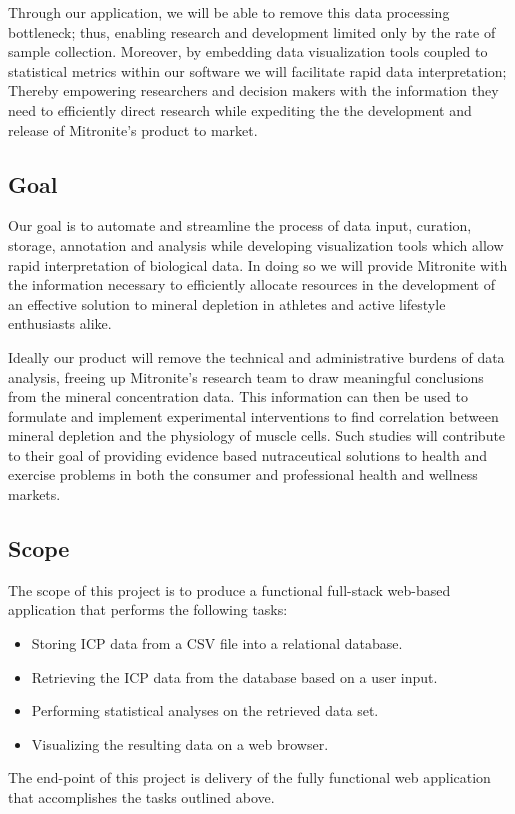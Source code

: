 \documentclass[10pt,twocolumn,letterpaper]{article}
\begin{document}
            Through our application, we will be able to remove this data processing bottleneck; thus, enabling research and development limited only by the rate of sample collection. Moreover, by embedding data visualization tools coupled to statistical metrics within our software we will facilitate rapid data interpretation; Thereby empowering researchers and decision makers with the information they need to efficiently direct research while expediting the the development and release of Mitronite's product to market.

            \subsection{Goal}

            Our goal is to automate and streamline the process of data input, curation, storage, annotation and analysis while developing visualization tools which allow rapid 
	    interpretation of biological data. 
	    In doing so we will provide Mitronite with the information necessary to efficiently allocate resources in the development of an effective solution to mineral depletion in 
	    athletes and active lifestyle enthusiasts alike.

            Ideally our product will remove the technical and administrative burdens of data analysis, freeing up Mitronite's research team to draw meaningful conclusions from the mineral concentration data. This information can then be used to formulate and implement experimental interventions to find correlation between mineral depletion and the physiology of muscle cells. Such studies will contribute to their goal of providing evidence based nutraceutical solutions to health and exercise problems in both the consumer and professional health and wellness markets.

            \subsection{Scope}
            The scope of this project is to produce a functional full-stack web-based application that performs the following tasks:
            \begin{itemize}
                  \item Storing ICP data from a CSV file into a relational database.
                  \item Retrieving the ICP data from the database based on a user input.
                  \item Performing statistical analyses on the retrieved data set.
                  \item Visualizing the resulting data on a web browser.
            \end{itemize}
            The end-point of this project is delivery of the fully functional web application that accomplishes the tasks outlined above.
\end{document}
